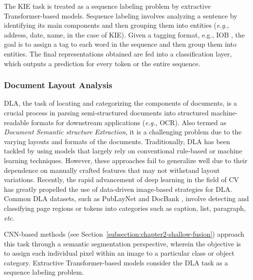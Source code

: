 The \ac{KIE} task is treated as a sequence labeling problem by extractive Transformer-based models. Sequence labeling involves analyzing a sentence by identifying its main components and then grouping them into entities  (\textit{e.g.}, address, date, name, in the case of \ac{KIE}). Given a tagging format, e.g., IOB \citep{ramshaw1999text}, the goal is to assign a tag to each word in the sequence and then group them into entities. The final representations obtained are fed into a classification layer, which outputs a prediction for every token or the entire sequence.


\subsubsection{Document Layout Analysis}

\ac{DLA}, the task of locating and categorizing the components of documents, is a crucial process in parsing semi-structured documents into structured machine-readable formats for downstream applications (\textit{e.g.}, \ac{OCR}). Also termed as \textit{Document Semantic structure Extraction}, it is a challenging problem due to the varying layouts and formats of the documents. Traditionally, \ac{DLA} has been tackled by using models that largely rely on conventional rule-based or machine learning techniques. However, these approaches fail to generalize well due to their dependence on manually crafted features that may not withstand layout variations. Recently, the rapid advancement of deep learning in the field of \ac{CV} has greatly propelled the use of data-driven image-based strategies for \ac{DLA}. Common \ac{DLA} datasets, such as PubLayNet \citep{zhong2019publaynet} and DocBank \citep{li2020docbank}, involve detecting and classifying page regions or tokens into categories such as caption, list, paragraph, \textit{etc}. 

\ac{CNN}-based methods (see Section~\ref{subsection:chapter2-shallow-fusion}) approach this task through a semantic segmentation perspective, wherein the objective is to assign each individual pixel within an image to a particular class or object category. Extractive Transformer-based models consider the \ac{DLA} task as a sequence labeling problem.


